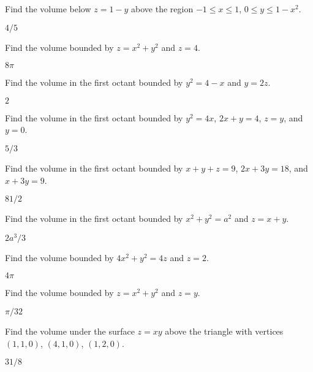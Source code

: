 \begin{enumialphparenastyle}
\begin{ex}
Find the volume below $z=1-y$ above the region
$-1\le x\le 1$, $0\le y\le 1-x^2$.
\begin{sol}
$4/5$
\end{sol}
\end{ex}

\begin{ex}
Find the volume bounded by $z=x^2+y^2$ and $z=4$.
\begin{sol}
$8\pi$
\end{sol}
\end{ex}

\begin{ex}
Find the volume in the first octant
bounded by $y^2=4-x$ and $y=2z$.
\begin{sol}
$2$
\end{sol}
\end{ex}

\begin{ex}
Find the volume in the first octant
bounded by $y^2=4x$, $2x+y=4$, $z=y$,
and $y=0$.
\begin{sol}
$5/3$
\end{sol}
\end{ex}

\begin{ex}
Find the volume in the first octant
bounded by $x+y+z=9$, $2x+3y=18$, and $x+3y=9$.
\begin{sol}
$81/2$
\end{sol}
\end{ex}

\begin{ex}
Find the volume in the first octant
bounded by $x^2+y^2=a^2$ and $z=x+y$.
\begin{sol}
$2a^3/3$
\end{sol}
\end{ex}

\begin{ex}
Find the volume bounded by $4x^2+y^2=4z$ and $z=2$.
\begin{sol}
$4\pi$
\end{sol}
\end{ex}

\begin{ex}
Find the volume bounded by $z=x^2+y^2$ and $z=y$.
\begin{sol}
$\pi/32$
\end{sol}
\end{ex}

\begin{ex}
Find the volume under the surface $z=xy$ above the triangle
with vertices $(1,1,0)$, $(4,1,0)$, $(1,2,0)$.
\begin{sol}
$31/8$
\end{sol}
\end{ex}


\end{enumialphparenastyle}
